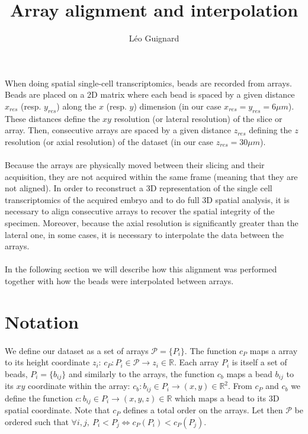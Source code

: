 \documentclass[10pt,a4paper]{article}
\author{L\'eo Guignard}
\title{Array alignment and interpolation}
\begin{document}
\maketitle
\paragraph{}When doing spatial single-cell transcriptomics, beads are recorded from arrays.
Beads are placed on a 2D matrix where each bead is spaced by a given distance $x_{res}$ (resp.
$y_{res}$) along the $x$ (resp.
$y$) dimension (in our case $x_{res}=y_{res}=6 \mu m$).
These distances define the $xy$ resolution (or lateral resolution) of the slice or array.
Then, consecutive arrays are spaced by a given distance $z_{res}$ defining the $z$ resolution (or axial resolution) of the dataset (in our case $z_{res}=30\mu m$).
\paragraph{}Because the arrays are physically moved between their slicing and their acquisition, they are not acquired within the same frame (meaning that they are not aligned).
In order to reconstruct a 3D representation of the single cell transcriptomics of the acquired embryo and to do full 3D spatial analysis, it is necessary to align consecutive arrays to recover the spatial integrity of the specimen.
Moreover, because the axial resolution is significantly greater than the lateral one, in some cases, it is necessary to interpolate the data between the arrays.
\paragraph{}In the following section we will describe how this alignment was performed together with how the beads were interpolated between arrays.
\section{Notation}
\paragraph{}We define our dataset as a set of arrays \(\mathcal{P}=\{P_i\}\).
The function $c_P$ maps a array to its height coordinate $z_i$: \(c_P: P_i\in \mathcal{P} \rightarrow z_i \in \mathbb{R}\).
Each array $P_i$ is itself a set of beads, \(P_i=\{b_{ij}\}\) and similarly to the arrays, the function \(c_b\) maps a bead \(b_{ij}\) to its \(xy\) coordinate within the array: \(c_b:b_{ij}\in P_i\rightarrow (x,y)\in \mathbb{R}^2\).
From \(c_P\) and \(c_b\) we define the function \(c:b_{ij}\in P_i\rightarrow (x,y,z)\in\mathbb{R}\) which maps a bead to its 3D spatial coordinate.
Note that \(c_P\) defines a total order on the arrays.
Let then \(\mathcal{P}\) be ordered such that \(\forall i,j,~P_i<P_j\iff c_P(P_i)<c_P(P_j)\).
\end{document}
